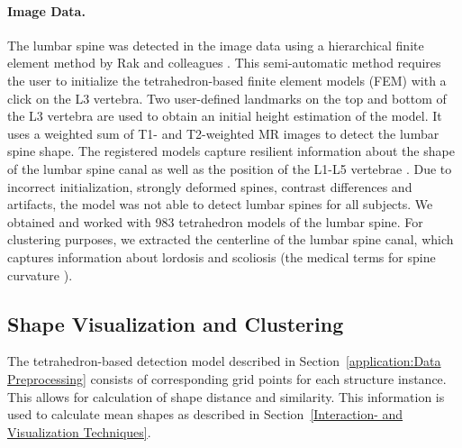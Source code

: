 \documentclass[journal]{style/vgtc} 			          %
\begin{document}
\paragraph{Image Data.} \label{Image-Data}
The lumbar spine was detected in the image data using a hierarchical finite element method by Rak and colleagues \cite{Rak2013}.
%
This semi-automatic method requires the user to initialize the tetrahedron-based finite element models (FEM) with a click on the L3 vertebra.
%
Two user-defined landmarks on the top and bottom of the L3 vertebra are used to obtain an initial height estimation of the model.
%
It uses a weighted sum of T1- and T2-weighted MR images to detect the lumbar spine shape.
%
The registered models capture resilient information about the shape of the lumbar spine canal as well as the position of the L1-L5 vertebrae \cite{Klemm2013VMV}.
%
Due to incorrect initialization, strongly deformed spines, contrast differences and artifacts, the model was not able to detect lumbar spines for all subjects.
%
We obtained and worked with 983 tetrahedron models of the lumbar spine.
%
For clustering purposes, we extracted the centerline of the lumbar spine canal, which captures information about lordosis and scoliosis (the medical terms for spine curvature \cite{Klemm2013VMV}).

\subsection{Shape Visualization and Clustering}
%
The tetrahedron-based detection model described in Section~\ref{application:Data Preprocessing} consists of corresponding grid points for each structure instance.
%
This allows for calculation of shape distance and similarity.
%
This information is used to calculate mean shapes as described in Section~\ref{Interaction- and Visualization Techniques}.
\end{document}
